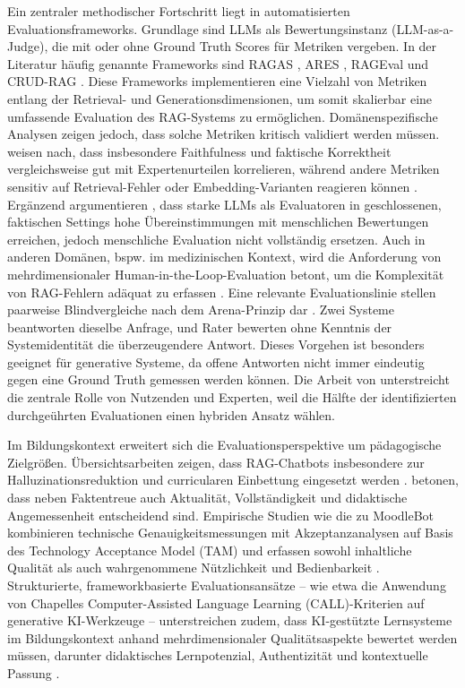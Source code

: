 Ein zentraler methodischer Fortschritt liegt in automatisierten Evaluationsframeworks. Grundlage sind LLMs als Bewertungsinstanz (LLM-as-a-Judge), die mit oder ohne Ground Truth Scores für Metriken vergeben. In der Literatur häufig genannte Frameworks sind RAGAS \cite{es2025ragas}, ARES \cite{SaadFalcon2024ARES}, RAGEval \cite{RAGEval} und CRUD-RAG \cite{CRUDRAG}. Diese Frameworks implementieren eine Vielzahl von Metriken entlang der Retrieval- und Generationsdimensionen, um somit skalierbar eine umfassende Evaluation des RAG-Systems zu ermöglichen. Domänenspezifische Analysen zeigen jedoch, dass solche Metriken kritisch validiert werden müssen.  weisen nach, dass insbesondere Faithfulness und faktische Korrektheit vergleichsweise gut mit Expertenurteilen korrelieren, während andere Metriken sensitiv auf Retrieval-Fehler oder Embedding-Varianten reagieren können \cite{Roychowdhury2024RAGAS}. Ergänzend argumentieren , dass starke LLMs als Evaluatoren in geschlossenen, faktischen Settings hohe Übereinstimmungen mit menschlichen Bewertungen erreichen, jedoch menschliche Evaluation nicht vollständig ersetzen. Auch in anderen Domänen, bspw. im medizinischen Kontext, wird die Anforderung von mehrdimensionaler Human-in-the-Loop-Evaluation betont, um die Komplexität von RAG-Fehlern adäquat zu erfassen \cite{Singhal2025MedQA}. Eine relevante Evaluationslinie stellen paarweise Blindvergleiche nach dem Arena-Prinzip dar \cite{Jiang2024GenAIArena,Son2025ArenaLite}. Zwei Systeme beantworten dieselbe Anfrage, und Rater bewerten ohne Kenntnis der Systemidentität die überzeugendere Antwort. Dieses Vorgehen ist besonders geeignet für generative Systeme, da offene Antworten nicht immer eindeutig gegen eine Ground Truth gemessen werden können. Die Arbeit von  unterstreicht die zentrale Rolle von Nutzenden und Experten, weil die Hälfte der identifizierten durchgeührten Evaluationen einen hybriden Ansatz wählen.

Im Bildungskontext erweitert sich die Evaluationsperspektive um pädagogische Zielgrößen. Übersichtsarbeiten zeigen, dass RAG-Chatbots insbesondere zur Halluzinationsreduktion und curricularen Einbettung eingesetzt werden \cite{Swacha2025RAGEducation}.  betonen, dass neben Faktentreue auch Aktualität, Vollständigkeit und didaktische Angemessenheit entscheidend sind. Empirische Studien wie die zu MoodleBot kombinieren technische Genauigkeitsmessungen mit Akzeptanzanalysen auf Basis des Technology Acceptance Model (TAM) und erfassen sowohl inhaltliche Qualität als auch wahrgenommene Nützlichkeit und Bedienbarkeit \cite{Neumann2024MoodleBot}. Strukturierte, frameworkbasierte Evaluationsansätze – wie etwa die Anwendung von Chapelles Computer-Assisted Language Learning (CALL)-Kriterien auf generative KI-Werkzeuge – unterstreichen zudem, dass KI-gestützte Lernsysteme im Bildungskontext anhand mehrdimensionaler Qualitätsaspekte bewertet werden müssen, darunter didaktisches Lernpotenzial, Authentizität und kontextuelle Passung \cite{Shetye2024Khanmigo}.

